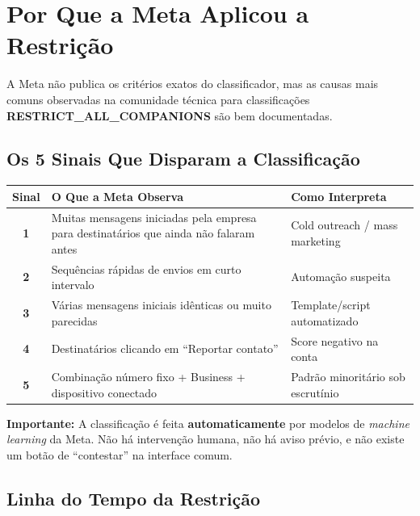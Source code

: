 \documentclass[12pt, a4paper]{article}
\begin{document}
\needspace{10cm}

\section{Por Que a Meta Aplicou a Restrição}

A Meta não publica os critérios exatos do classificador, mas as causas mais comuns observadas na comunidade técnica para classificações \textbf{RESTRICT\_ALL\_COMPANIONS} são bem documentadas.

\subsection{Os 5 Sinais Que Disparam a Classificação}

\begin{table}[H]
    \centering
    \renewcommand{\arraystretch}{1.5}
    \begin{tabularx}{\textwidth}{c X X}
        \toprule
        \rowcolor{tableHeader} \textbf{Sinal} & \textbf{O Que a Meta Observa} & \textbf{Como Interpreta} \\
        \midrule
        \textbf{1} & Muitas mensagens iniciadas pela empresa para destinatários que ainda não falaram antes & Cold outreach / mass marketing \\
        \rowcolor{lightGray}
        \textbf{2} & Sequências rápidas de envios em curto intervalo & Automação suspeita \\
        \textbf{3} & Várias mensagens iniciais idênticas ou muito parecidas & Template/script automatizado \\
        \rowcolor{lightGray}
        \textbf{4} & Destinatários clicando em ``Reportar contato'' & Score negativo na conta \\
        \textbf{5} & Combinação número fixo + Business + dispositivo conectado & Padrão minoritário sob escrutínio \\
        \bottomrule
    \end{tabularx}
\end{table}

\textcolor{warningOrange}{\textbf{Importante:}} A classificação é feita \textbf{automaticamente} por modelos de \textit{machine learning} da Meta. Não há intervenção humana, não há aviso prévio, e não existe um botão de ``contestar'' na interface comum.

\subsection{Linha do Tempo da Restrição}
\end{document}
